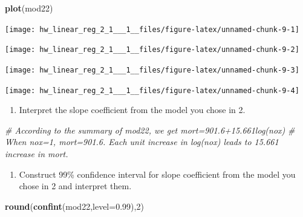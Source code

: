 \documentclass[]{article}
\newenvironment{Shaded}{\begin{snugshade}}{\end{snugshade}}
\newcommand{\KeywordTok}[1]{\textcolor[rgb]{0.13,0.29,0.53}{\textbf{#1}}}
\newcommand{\DataTypeTok}[1]{\textcolor[rgb]{0.13,0.29,0.53}{#1}}
\newcommand{\DecValTok}[1]{\textcolor[rgb]{0.00,0.00,0.81}{#1}}
\newcommand{\FloatTok}[1]{\textcolor[rgb]{0.00,0.00,0.81}{#1}}
\newcommand{\CommentTok}[1]{\textcolor[rgb]{0.56,0.35,0.01}{\textit{#1}}}
\newcommand{\NormalTok}[1]{#1}
\providecommand{\tightlist}{%
  \setlength{\itemsep}{0pt}\setlength{\parskip}{0pt}}
\begin{document}
\begin{Shaded}
\begin{Highlighting}[]
\KeywordTok{plot}\NormalTok{(mod22)}
\end{Highlighting}
\end{Shaded}

\begin{center}\texttt{[image: hw\_linear\_reg\_2\_1\_\_\_1\_\_files/figure-latex/unnamed-chunk-9-1]} \end{center}

\begin{center}\texttt{[image: hw\_linear\_reg\_2\_1\_\_\_1\_\_files/figure-latex/unnamed-chunk-9-2]} \end{center}

\begin{center}\texttt{[image: hw\_linear\_reg\_2\_1\_\_\_1\_\_files/figure-latex/unnamed-chunk-9-3]} \end{center}

\begin{center}\texttt{[image: hw\_linear\_reg\_2\_1\_\_\_1\_\_files/figure-latex/unnamed-chunk-9-4]} \end{center}

\begin{enumerate}
\def\labelenumi{\arabic{enumi}.}
\setcounter{enumi}{2}
\tightlist
\item
  Interpret the slope coefficient from the model you chose in 2.
\end{enumerate}

\begin{Shaded}
\begin{Highlighting}[]
\CommentTok{# According to the summary of mod22, we get mort=901.6+15.661log(nox)}
\CommentTok{# When nox=1, mort=901.6. Each unit increase in log(nox) leads to 15.661 increase in mort.}
\end{Highlighting}
\end{Shaded}

\begin{enumerate}
\def\labelenumi{\arabic{enumi}.}
\setcounter{enumi}{3}
\tightlist
\item
  Construct 99\% confidence interval for slope coefficient from the
  model you chose in 2 and interpret them.
\end{enumerate}

\begin{Shaded}
\begin{Highlighting}[]
\KeywordTok{round}\NormalTok{(}\KeywordTok{confint}\NormalTok{(mod22,}\DataTypeTok{level=}\FloatTok{0.99}\NormalTok{),}\DecValTok{2}\NormalTok{) }
\end{Highlighting}
\end{Shaded}
\end{document}
